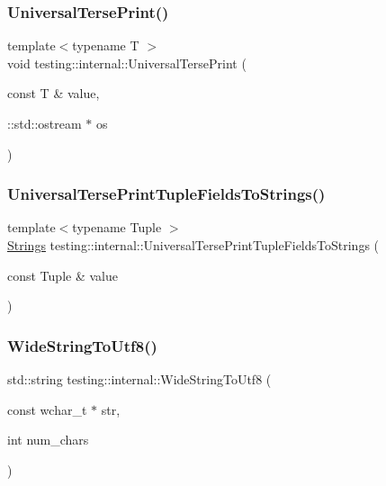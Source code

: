\subsubsection{\texorpdfstring{UniversalTersePrint()}{UniversalTersePrint()}}
{\footnotesize\ttfamily template$<$typename T $>$ \\
void testing\+::internal\+::\+Universal\+Terse\+Print (\begin{DoxyParamCaption}\item[{const T \&}]{value,  }\item[{\+::std\+::ostream $\ast$}]{os }\end{DoxyParamCaption})}

\mbox{\label{namespacetesting_1_1internal_a7e60d1478b074801c766eeee9be6c772}} 
\subsubsection{\texorpdfstring{UniversalTersePrintTupleFieldsToStrings()}{UniversalTersePrintTupleFieldsToStrings()}}
{\footnotesize\ttfamily template$<$typename Tuple $>$ \\
\mbox{\hyperlink{namespacetesting_1_1internal_a4ad7524c75dfadde584df6d5b4742aa8}{Strings}} testing\+::internal\+::\+Universal\+Terse\+Print\+Tuple\+Fields\+To\+Strings (\begin{DoxyParamCaption}\item[{const Tuple \&}]{value }\end{DoxyParamCaption})}

\mbox{\label{namespacetesting_1_1internal_a05b8c86ff38243f34d8f839a0eadefb1}} 
\subsubsection{\texorpdfstring{WideStringToUtf8()}{WideStringToUtf8()}}
{\footnotesize\ttfamily std\+::string testing\+::internal\+::\+Wide\+String\+To\+Utf8 (\begin{DoxyParamCaption}\item[{const wchar\+\_\+t $\ast$}]{str,  }\item[{int}]{num\+\_\+chars }\end{DoxyParamCaption})}

